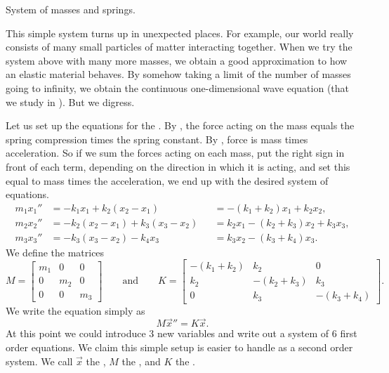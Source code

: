\begin{myfig}
\capstart
{}
\caption{System of masses and springs.\label{sosa:threecartsfig}}
\end{myfig}

This simple system turns up in unexpected places.  For example, 
our world really consists of many small particles of matter interacting together.
When we try the system above with many more masses, we obtain a good approximation to
how an elastic material behaves.  By somehow taking a limit of
the number of masses going to infinity, we obtain the continuous
one-dimensional wave equation (that we study in ).
But we digress.

Let us set up the equations for the .
By , the force acting on the mass equals the 
spring compression times the spring constant.  By
,
force is mass times acceleration.  So if we sum the forces acting
on each mass, put the right sign in front of each term, depending on the
direction in which it is acting, and set this equal to mass
times the acceleration, we end up with the desired system of
equations.
\begin{equation*}
\begin{aligned}
m_1 x_1'' &= -k_1 x_1 + k_2 (x_2-x_1)
& & = -(k_1+k_2) x_1 + k_2 x_2 , \\
m_2 x_2'' &= -k_2 (x_2-x_1) + k_3 (x_3-x_2)
& & = k_2 x_1 -(k_2+k_3) x_2 + k_3 x_3 , \\
m_3 x_3'' &= -k_3 (x_3-x_2) - k_4 x_3
& & = k_3 x_2 - (k_3+k_4) x_3 . 
\end{aligned}
\end{equation*}
We define the matrices
\begin{equation*}
M =
\begin{bmatrix}
m_1 & 0 & 0 \\
0 & m_2 & 0 \\
0 & 0 & m_3
\end{bmatrix}
\qquad
\text{and}
\qquad
K =
\begin{bmatrix}
-(k_1+k_2) & k_2 & 0 \\
k_2 & -(k_2+k_3) & k_3 \\
0 & k_3 & -(k_3+k_4)
\end{bmatrix} .
\end{equation*}
We write the equation simply as
\begin{equation*}
M {\vec{x}}'' = K \vec{x} .
\end{equation*}
At this point we could introduce 3 new variables and write out a system
of 6 first order equations.  We claim this simple setup is easier to handle as
a second order system.
We call $\vec{x}$ the \emph{}, $M$ the
\emph{}, and $K$ the \emph{}.

